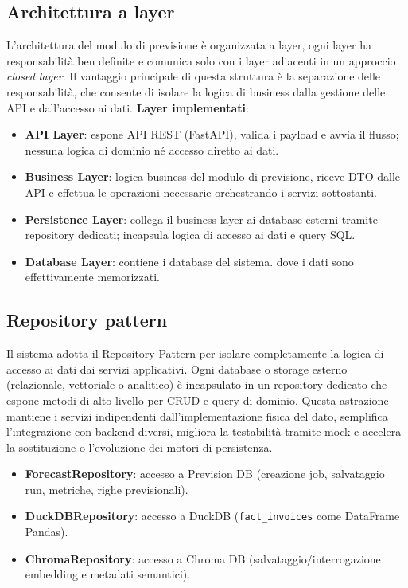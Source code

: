 \subsection{Architettura a layer}
L’architettura del modulo di previsione è organizzata a layer, ogni layer ha responsabilità ben definite e comunica solo con i layer adiacenti in un approccio \emph{closed layer}.
Il vantaggio principale di questa struttura è la separazione delle responsabilità, che consente di isolare la logica di business dalla gestione delle API e dall’accesso ai dati.
\textbf{Layer implementati}:
\begin{itemize}
    \item \textbf{API Layer}: espone API REST (FastAPI), valida i payload e avvia il flusso; nessuna logica di dominio né accesso diretto ai dati.
    \item \textbf{Business Layer}: logica business del modulo di previsione, riceve DTO dalle API e effettua le operazioni necessarie orchestrando i servizi sottostanti.
    \item \textbf{Persistence Layer}: collega il business layer ai database esterni tramite repository dedicati; incapsula logica di accesso ai dati e query SQL.
    \item \textbf{Database Layer}: contiene i database del sistema. dove i dati sono effettivamente memorizzati.
\end{itemize}

\subsection{Repository pattern}
Il sistema adotta il Repository Pattern per isolare completamente la logica di accesso ai dati dai servizi applicativi. Ogni database o storage esterno (relazionale, vettoriale o analitico) è incapsulato in un repository dedicato che espone metodi di alto livello per CRUD e query di dominio. Questa astrazione mantiene i servizi indipendenti dall’implementazione fisica del dato, semplifica l’integrazione con backend diversi, migliora la testabilità tramite mock e accelera la sostituzione o l’evoluzione dei motori di persistenza.
\begin{itemize}
    \item \textbf{ForecastRepository}: accesso a Prevision DB (creazione job, salvataggio run, metriche, righe previsionali).
    \item \textbf{DuckDBRepository}: accesso a DuckDB (\texttt{fact\_invoices} come DataFrame Pandas).
    \item \textbf{ChromaRepository}: accesso a Chroma DB (salvataggio/interrogazione embedding e metadati semantici).
\end{itemize}


